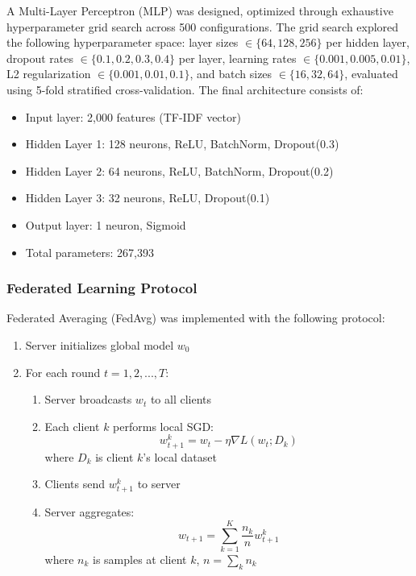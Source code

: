\documentclass[pdflatex,sn-mathphys-num]{sn-jnl}
\theoremstyle{thmstyleone}%
\theoremstyle{thmstyletwo}%
\theoremstyle{thmstylethree}%
\begin{document}
A Multi-Layer Perceptron (MLP) was designed, optimized through exhaustive hyperparameter grid search across 500 configurations. The grid search explored the following hyperparameter space: layer sizes $\in \{64, 128, 256\}$ per hidden layer, dropout rates $\in \{0.1, 0.2, 0.3, 0.4\}$ per layer, learning rates $\in \{0.001, 0.005, 0.01\}$, L2 regularization $\in \{0.001, 0.01, 0.1\}$, and batch sizes $\in \{16, 32, 64\}$, evaluated using 5-fold stratified cross-validation. The final architecture consists of:

\begin{itemize}
    \item Input layer: 2,000 features (TF-IDF vector)
    \item Hidden Layer 1: 128 neurons, ReLU, BatchNorm, Dropout(0.3)
    \item Hidden Layer 2: 64 neurons, ReLU, BatchNorm, Dropout(0.2)
    \item Hidden Layer 3: 32 neurons, ReLU, Dropout(0.1)
    \item Output layer: 1 neuron, Sigmoid
    \item Total parameters: 267,393
\end{itemize}

\subsubsection{Federated Learning Protocol}\label{subsubsec:flprotocol}

Federated Averaging (FedAvg) was implemented with the following protocol:

\begin{enumerate}
    \item Server initializes global model $w_0$
    \item For each round $t = 1, 2, ..., T$:
    \begin{enumerate}
        \item Server broadcasts $w_t$ to all clients
        \item Each client $k$ performs local SGD:
        \begin{equation}
            w_{t+1}^k = w_t - \eta \nabla L(w_t; D_k)
        \end{equation}
        where $D_k$ is client $k$'s local dataset
        \item Clients send $w_{t+1}^k$ to server
        \item Server aggregates:
        \begin{equation}
            w_{t+1} = \sum_{k=1}^{K} \frac{n_k}{n} w_{t+1}^k
        \end{equation}
        where $n_k$ is samples at client $k$, $n = \sum_k n_k$
    \end{enumerate}
\end{enumerate}
\end{document}
